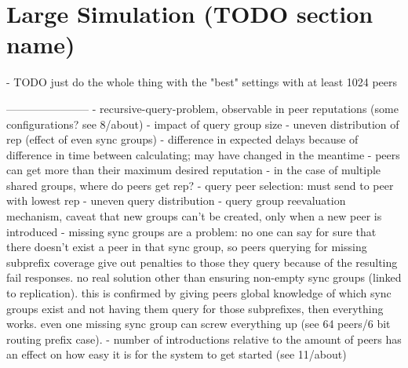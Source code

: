\section{Large Simulation (TODO section name)}
- TODO just do the whole thing with the "best" settings with at least 1024 peers


-----------------------
- recursive-query-problem, observable in peer reputations (some configurations?
  see 8/about)
- impact of query group size
- uneven distribution of rep (effect of even sync groups)
- difference in expected delays because of difference in time between
  calculating; may have changed in the meantime
- peers can get more than their maximum desired reputation
- in the case of multiple shared groups, where do peers get rep?
- query peer selection: must send to peer with lowest rep
- uneven query distribution
- query group reevaluation mechanism, caveat that new groups can't be created,
  only when a new peer is introduced
- missing sync groups are a problem: no one can say for sure that there doesn't
  exist a peer in that sync group, so peers querying for missing subprefix
  coverage give out penalties to those they query because of the resulting fail
  responses. no real solution other than ensuring non-empty sync groups (linked
  to replication). this is confirmed by giving peers global knowledge of which
  sync groups exist and not having them query for those subprefixes, then
  everything works. even one missing sync group can screw everything up (see 64
  peers/6 bit routing prefix case).
- number of introductions relative to the amount of peers has an effect on how
  easy it is for the system to get started (see 11/about)
